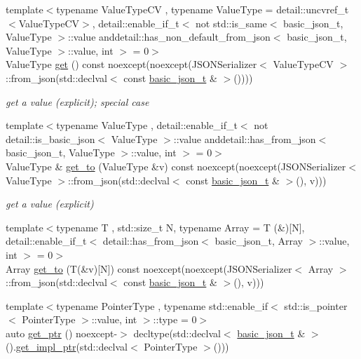\begin{DoxyCompactItemize}
{\footnotesize template$<$typename Value\+Type\+CV , typename Value\+Type  = detail\+::uncvref\+\_\+t$<$\+Value\+Type\+C\+V$>$, detail\+::enable\+\_\+if\+\_\+t$<$ not std\+::is\+\_\+same$<$ basic\+\_\+json\+\_\+t, Value\+Type $>$\+::value anddetail\+::has\+\_\+non\+\_\+default\+\_\+from\+\_\+json$<$ basic\+\_\+json\+\_\+t, Value\+Type $>$\+::value, int $>$  = 0$>$ }\\Value\+Type \hyperlink{classnlohmann_1_1basic__json_a5afa21d477e13fa7a3dcd7ea66c48b52}{get} () const noexcept(noexcept(J\+S\+O\+N\+Serializer$<$ Value\+Type\+CV $>$\+::from\+\_\+json(std\+::declval$<$ const \hyperlink{classnlohmann_1_1basic__json_afff7860310ae69f29f8158a77ec0ef13}{basic\+\_\+json\+\_\+t} \& $>$())))
\begin{DoxyCompactList}\small\item\em get a value (explicit); special case \end{DoxyCompactList}\item 
{\footnotesize template$<$typename Value\+Type , detail\+::enable\+\_\+if\+\_\+t$<$ not detail\+::is\+\_\+basic\+\_\+json$<$ Value\+Type $>$\+::value anddetail\+::has\+\_\+from\+\_\+json$<$ basic\+\_\+json\+\_\+t, Value\+Type $>$\+::value, int $>$  = 0$>$ }\\Value\+Type \& \hyperlink{classnlohmann_1_1basic__json_a65753c68f06639eda0d355f919564e01}{get\+\_\+to} (Value\+Type \&v) const noexcept(noexcept(J\+S\+O\+N\+Serializer$<$ Value\+Type $>$\+::from\+\_\+json(std\+::declval$<$ const \hyperlink{classnlohmann_1_1basic__json_afff7860310ae69f29f8158a77ec0ef13}{basic\+\_\+json\+\_\+t} \& $>$(), v)))
\begin{DoxyCompactList}\small\item\em get a value (explicit) \end{DoxyCompactList}\item 
{\footnotesize template$<$typename T , std\+::size\+\_\+t N, typename Array  = T (\&)\mbox{[}\+N\mbox{]}, detail\+::enable\+\_\+if\+\_\+t$<$ detail\+::has\+\_\+from\+\_\+json$<$ basic\+\_\+json\+\_\+t, Array $>$\+::value, int $>$  = 0$>$ }\\Array \hyperlink{classnlohmann_1_1basic__json_ab9d91cc9c3b62782b38d8f2158269937}{get\+\_\+to} (T(\&v)\mbox{[}N\mbox{]}) const noexcept(noexcept(J\+S\+O\+N\+Serializer$<$ Array $>$\+::from\+\_\+json(std\+::declval$<$ const \hyperlink{classnlohmann_1_1basic__json_afff7860310ae69f29f8158a77ec0ef13}{basic\+\_\+json\+\_\+t} \& $>$(), v)))
\item 
{\footnotesize template$<$typename Pointer\+Type , typename std\+::enable\+\_\+if$<$ std\+::is\+\_\+pointer$<$ Pointer\+Type $>$\+::value, int $>$\+::type  = 0$>$ }\\auto \hyperlink{classnlohmann_1_1basic__json_aa263420f5d1e68b05d25a83a457725a0}{get\+\_\+ptr} () noexcept-\/$>$ decltype(std\+::declval$<$ \hyperlink{classnlohmann_1_1basic__json_afff7860310ae69f29f8158a77ec0ef13}{basic\+\_\+json\+\_\+t} \& $>$().\hyperlink{classnlohmann_1_1basic__json_a58b65f595883fb93333423ec5e3bafee}{get\+\_\+impl\+\_\+ptr}(std\+::declval$<$ Pointer\+Type $>$()))

\end{DoxyCompactItemize}
